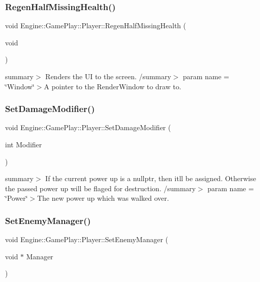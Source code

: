 \subsubsection{\texorpdfstring{Regen\+Half\+Missing\+Health()}{RegenHalfMissingHealth()}}
{\footnotesize\ttfamily void Engine\+::\+Game\+Play\+::\+Player\+::\+Regen\+Half\+Missing\+Health (\begin{DoxyParamCaption}\item[{void}]{ }\end{DoxyParamCaption})}

summary$>$ Renders the UI to the screen. /summary$>$ param name = \char`\"{}\+Window\char`\"{}$>$A pointer to the Render\+Window to draw to.\mbox{\label{class_engine_1_1_game_play_1_1_player_a04dccb49dde0606ba440b07944abdc65}} 
\subsubsection{\texorpdfstring{Set\+Damage\+Modifier()}{SetDamageModifier()}}
{\footnotesize\ttfamily void Engine\+::\+Game\+Play\+::\+Player\+::\+Set\+Damage\+Modifier (\begin{DoxyParamCaption}\item[{int}]{Modifier }\end{DoxyParamCaption})}

summary$>$ If the current power up is a nullptr, then it\textquotesingle{}ll be assigned. Otherwise the passed power up will be flaged for destruction. /summary$>$ param name = \char`\"{}\+Power\char`\"{}$>$The new power up which was walked over.\mbox{\label{class_engine_1_1_game_play_1_1_player_adedc5552f70e5495ca1391b6f6143bec}} 
\subsubsection{\texorpdfstring{Set\+Enemy\+Manager()}{SetEnemyManager()}}
{\footnotesize\ttfamily void Engine\+::\+Game\+Play\+::\+Player\+::\+Set\+Enemy\+Manager (\begin{DoxyParamCaption}\item[{void $\ast$}]{Manager }\end{DoxyParamCaption})}


